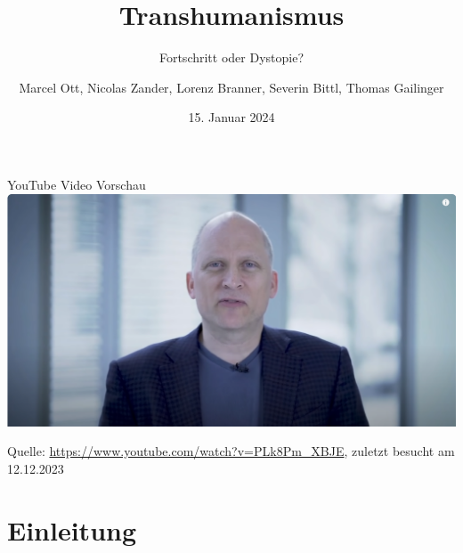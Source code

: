 \documentclass[aspectratio=169,16pt,xcolor=table]{beamer}
\date{15. Januar 2024}
\begin{document}
\begin{frame}{YouTube Video Vorschau}
    \centering
    \href{https://www.youtube.com/watch?v=PLk8Pm_XBJE&t=612s}{\includegraphics[width=0.8\linewidth]{pictures/Video_Vorschau.png}}
    \vspace{-0.2cm}
    \begin{flushleft}
        \tiny Quelle: \url{https://www.youtube.com/watch?v=PLk8Pm_XBJE}, zuletzt besucht am 12.12.2023
    \end{flushleft}
\end{frame}

\title{Transhumanismus}
\subtitle{Fortschritt oder Dystopie?}
\author{Marcel Ott, Nicolas Zander, Lorenz Branner, Severin Bittl, Thomas Gailinger}

\maketitle


\section{Einleitung}
\end{document}
